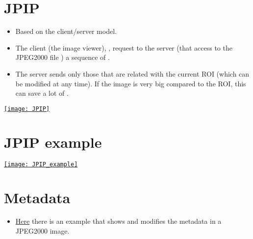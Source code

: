 \section{\gls{JPIP}}
\begin{itemize}
\item Based on the client/server model.
\item The client (the image viewer), , request to the server (that access to the
  JPEG2000 file ) a sequence
  of  \cite{ORTIZ04b}.
\item The server sends only those  that are related with the current
  \gls{ROI} (which can be modified at any time). If the image is very
  big compared to the \gls{ROI}, this can save a lot of
  .
\end{itemize}
\begin{center}
  \href{http://www.hpca.ual.es/~vruiz/papers/ORTIZ04c.pdf}{\texttt{[image: JPIP]}}
\end{center}

\section*{\gls{JPIP} example}
\begin{center}
  \href{https://ieeexplore.ieee.org/document/7214293}{\texttt{[image: JPIP\_example]}}
\end{center}

\section{Metadata}
\begin{itemize}
\item
  \href{https://github.com/vicente-gonzalez-ruiz/medical_imaging/blob/main/notebooks/JPEG2000_add_metadata.ipynb}{Here}
  there is an example that shows and modifies the metadata in a JPEG2000
  image.
\end{itemize}

